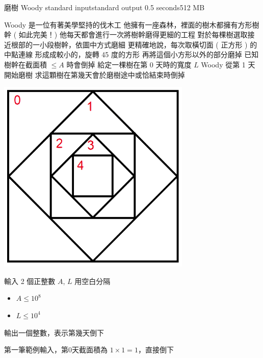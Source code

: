 \gdef\thisproblemauthor{}
\gdef\thisproblemdeveloper{}
\gdef\thisproblemorigin{}
\begin{problem}{磨樹 Woody}
{standard input}{standard output}
{0.5 seconds}{512 MB}{}

Woody 是一位有著美學堅持的伐木工 \newline
他擁有一座森林，裡面的樹木都擁有方形樹幹 ( 如此完美！) \newline
他每天都會進行一次將樹幹磨得更細的工程 \newline
對於每棵樹選取接近根部的一小段樹幹，依圖中方式磨細 \newline
\newline
更精確地說，每次取橫切面 ( 正方形 ) 的中點連線 \newline
形成成較小的，旋轉 45 度的方形 \newline
再將這個小方形以外的部分磨掉 \newline
\newline
已知樹幹在截面積 $ \leq A $ 時會倒掉 \newline
給定一棵樹在第 0 天時的寬度 $ L $ \newline
Woody 從第 1 天開始磨樹 \newline
求這顆樹在第幾天會於磨樹途中或恰結束時倒掉 \newline

\centerline{\includegraphics[scale=0.8]{./pics/A.png}}

\InputFile

輸入 2 個正整數 $ A $, $ L $ \newline
用空白分隔
\begin{iofmt}
\begin{itemize}
	\item $ A \leq 10^8 $
	\item $ L \leq 10^4 $
\end{itemize}
\end{iofmt}

\OutputFile

輸出一個整數，表示第幾天倒下

\Examples

\begin{example}
%
%
%
\end{example}

第一筆範例輸入，第0天截面積為 $1 \times 1 = 1$，直接倒下

\end{problem}
